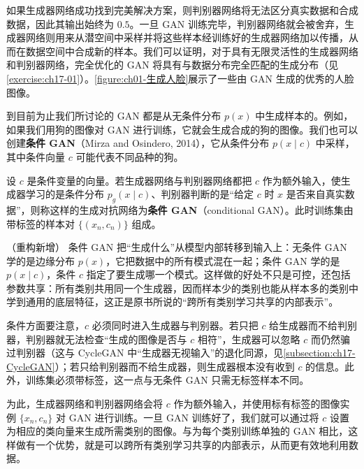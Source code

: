 \documentclass[../../main.tex]{subfiles}
\begin{document}
如果生成器网络成功找到完美解决方案，则判别器网络将无法区分真实数据和合成数据，因此其输出始终为 $0.5$。一旦 GAN 训练完毕，判别器网络就会被舍弃，生成器网络则用来从潜空间中采样并将这些样本经训练好的生成器网络加以传播，从而在数据空间中合成新的样本。我们可以证明，对于具有无限灵活性的生成器网络和判别器网络，完全优化的 GAN 将具有与数据分布完全匹配的生成分布（见\cref{exercise:ch17-01}）。\cref{figure:ch01-生成人脸}展示了一些由 GAN 生成的优秀的人脸图像。

到目前为止我们所讨论的 GAN 都是从无条件分布 $p(x)$ 中生成样本的。例如，如果我们用狗的图像对 GAN 进行训练，它就会生成合成的狗的图像。我们也可以创建\textbf{条件 GAN}（Mirza and Osindero, 2014），它从条件分布 $p(x\mid c)$ 中采样，其中条件向量 $c$ 可能代表不同品种的狗。

\begin{definition}[条件 GAN]\label{definition:ch17-条件GAN}
设 $c$ 是条件变量的向量。若生成器网络与判别器网络都把 $c$ 作为额外输入，使生成器学习的是条件分布 $p_g(x\mid c)$、判别器判断的是“给定 $c$ 时 $x$ 是否来自真实数据”，则称这样的生成对抗网络为\textbf{条件 GAN}（conditional GAN）。此时训练集由带标签的样本对 $\{(x_n,c_n)\}$ 组成。
\end{definition}

\begin{remark}（重构新增）
条件 GAN 把“生成什么”从模型内部转移到输入上：无条件 GAN 学的是边缘分布 $p(x)$，它把数据中的所有模式混在一起；条件 GAN 学的是 $p(x\mid c)$，条件 $c$ 指定了要生成哪一个模式。这样做的好处不只是可控，还包括参数共享：所有类别共用同一个生成器，因而样本少的类别也能从样本多的类别中学到通用的底层特征，这正是原书所说的“跨所有类别学习共享的内部表示”。

条件方面要注意，$c$ 必须同时进入生成器与判别器。若只把 $c$ 给生成器而不给判别器，判别器就无法检查“生成的图像是否与 $c$ 相符”，生成器可以忽略 $c$ 而仍然骗过判别器（这与 CycleGAN 中“生成器无视输入”的退化同源，见\cref{subsection:ch17-CycleGAN}）；若只给判别器而不给生成器，则生成器根本没有收到 $c$ 的信息。此外，训练集必须带标签，这一点与无条件 GAN 只需无标签样本不同。
\end{remark}

为此，生成器网络和判别器网络会将 $c$ 作为额外输入，并使用标有标签的图像实例 $\{x_n,c_n\}$ 对 GAN 进行训练。一旦 GAN 训练好了，我们就可以通过将 $c$ 设置为相应的类向量来生成所需类别的图像。与为每个类别训练单独的 GAN 相比，这样做有一个优势，就是可以跨所有类别学习共享的内部表示，从而更有效地利用数据。
\end{document}
